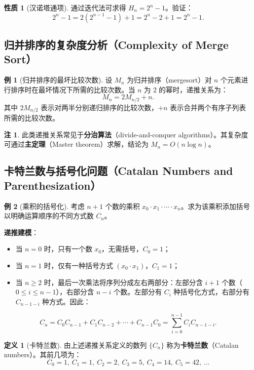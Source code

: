 \documentclass[UTF8,11pt,a4paper]{ctexbook}   %
\theoremstyle{definition}
\newtheorem{definition}{定义}[section]
\newtheorem{example}{例}[section]
\newtheorem{property}{性质}[section]
\newtheorem{remark}{注}[section]
\begin{document}
\begin{property}[汉诺塔通项]
通过迭代法可求得 $H_n = 2^n - 1$。验证：
\[
2^n - 1 = 2(2^{n-1}-1)+1 = 2^n - 2 + 1 = 2^n - 1.
\]
\end{property}

\subsection{归并排序的复杂度分析（Complexity of Merge Sort）}

\begin{example}[归并排序的最坏比较次数]
设 $M_n$ 为归并排序（mergesort）对 $n$ 个元素进行排序时在最坏情况下所需的比较次数。当 $n$ 为 $2$ 的幂时，递推关系为：
\[
M_n = 2M_{n/2} + n.
\]
其中 $2M_{n/2}$ 表示对两半分别递归排序的比较次数，$+n$ 表示合并两个有序子列表所需的比较次数。
\end{example}

\begin{remark}
此类递推关系常见于\textbf{分治算法}（divide-and-conquer algorithms）。其复杂度可通过\textbf{主定理}（Master theorem）求解，结论为 $M_n = O(n \log n)$。
\end{remark}

\subsection{卡特兰数与括号化问题（Catalan Numbers and Parenthesization）}

\begin{example}[乘积的括号化]
考虑 $n+1$ 个数的乘积 $x_0 \cdot x_1 \cdot \cdots \cdot x_n$。求为该乘积添加括号以明确运算顺序的不同方式数 $C_n$。

\textbf{递推建模}：
\begin{itemize}
    \item 当 $n=0$ 时，只有一个数 $x_0$，无需括号，$C_0 = 1$；
    \item 当 $n=1$ 时，仅有一种括号方式 $(x_0 \cdot x_1)$，$C_1 = 1$；
    \item 当 $n \ge 2$ 时，最后一次乘法将序列分成左右两部分：左部分含 $i+1$ 个数（$0 \le i \le n-1$），右部分含 $n-i$ 个数。左部分有 $C_i$ 种括号化方式，右部分有 $C_{n-1-i}$ 种方式。因此：
\end{itemize}
\[
C_n = C_0 C_{n-1} + C_1 C_{n-2} + \cdots + C_{n-1} C_0 = \sum_{i=0}^{n-1} C_i C_{n-1-i}.
\]
\end{example}

\begin{definition}[卡特兰数]
由上述递推关系定义的数列 $\{C_n\}$ 称为\textbf{卡特兰数}（Catalan numbers）。其前几项为：
\[
C_0=1,\ C_1=1,\ C_2=2,\ C_3=5,\ C_4=14,\ C_5=42,\ \dots
\]
\end{definition}
\end{document}
